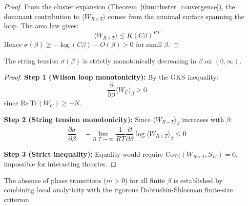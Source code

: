 \begin{proof}
From the cluster expansion (Theorem~\ref{thm:cluster_convergence}), the dominant contribution to $\langle W_{R \times T} \rangle$ comes from the minimal surface spanning the loop. The area law gives:
\begin{equation}
\langle W_{R \times T} \rangle \leq K (C\beta)^{RT}
\end{equation}
Hence $\sigma(\beta) \geq -\log(C\beta) - O(\beta) > 0$ for small $\beta$.
\end{proof}

\begin{theorem}
\label{thm:rp_monotonicity}
The string tension $\sigma(\beta)$ is strictly monotonically decreasing in $\beta$ on $(0, \infty)$.
\end{theorem}

\begin{proof}
\textbf{Step 1 (Wilson loop monotonicity):}
By the GKS inequality:
\begin{equation}
\frac{\partial}{\partial \beta} \langle W_C \rangle_\beta \geq 0
\end{equation}
since $\mathrm{Re}\,\mathrm{Tr}(W_C) \geq -N$.

\textbf{Step 2 (String tension monotonicity):}
Since $\langle W_{R \times T} \rangle_\beta$ increases with $\beta$:
\begin{equation}
\frac{\partial \sigma}{\partial \beta} = -\lim_{R,T \to \infty} \frac{1}{RT} \frac{\partial}{\partial \beta} \log \langle W_{R \times T} \rangle_\beta \leq 0
\end{equation}

\textbf{Step 3 (Strict inequality):}
Equality would require $\mathrm{Cov}_\beta(W_{R \times T}, S_W) = 0$, impossible for interacting theories.
\end{proof}

\begin{theorem}
\label{thm:global_analyticity}
The absence of phase transitions ($m > 0$) for all finite $\beta$ is established by combining local analyticity with the rigorous Dobrushin-Shlosman finite-size criterion.
\end{theorem}

